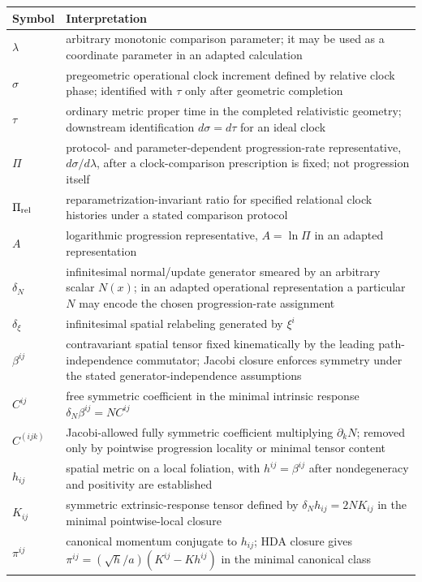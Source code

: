 \documentclass[11pt]{article}
\begin{document}
\begin{center}
\small
\begin{tabular}{@{}>{\raggedright\arraybackslash}p{}p{}@{}}
\toprule
Symbol & Interpretation \\
\midrule
$\lambda$ & arbitrary monotonic comparison parameter; it may be used as a coordinate parameter in an adapted calculation \\
$\sigma$ & pregeometric operational clock increment defined by relative clock phase; identified with $\tau$ only after geometric completion \\
$\tau$ & ordinary metric proper time in the completed relativistic geometry; downstream identification $d\sigma=d\tau$ for an ideal clock \\
$\Pi$ & protocol- and parameter-dependent progression-rate representative, $d\sigma/d\lambda$, after a clock-comparison prescription is fixed; not progression itself \\
$\Pi_{\rm rel}$ & reparametrization-invariant ratio for specified relational clock histories under a stated comparison protocol \\
$A$ & logarithmic progression representative, $A=\ln\Pi$ in an adapted representation \\
$\delta_N$ & infinitesimal normal/update generator smeared by an arbitrary scalar $N(x)$; in an adapted operational representation a particular $N$ may encode the chosen progression-rate assignment \\
$\delta_\xi$ & infinitesimal spatial relabeling generated by $\xi^i$ \\
$\beta^{ij}$ & contravariant spatial tensor fixed kinematically by the leading path-independence commutator; Jacobi closure enforces symmetry under the stated generator-independence assumptions \\
$C^{ij}$ & free symmetric coefficient in the minimal intrinsic response $\delta_N\beta^{ij}=NC^{ij}$ \\
$C^{(ijk)}$ & Jacobi-allowed fully symmetric coefficient multiplying $\partial_kN$; removed only by pointwise progression locality or minimal tensor content \\
$h_{ij}$ & spatial metric on a local foliation, with $h^{ij}=\beta^{ij}$ after nondegeneracy and positivity are established \\
$K_{ij}$ & symmetric extrinsic-response tensor defined by $\delta_Nh_{ij}=2NK_{ij}$ in the minimal pointwise-local closure \\
$\pi^{ij}$ & canonical momentum conjugate to $h_{ij}$; HDA closure gives $\pi^{ij}=(\sqrt h/a)(K^{ij}-Kh^{ij})$ in the minimal canonical class \\

\end{tabular}
\end{center}
\end{document}
